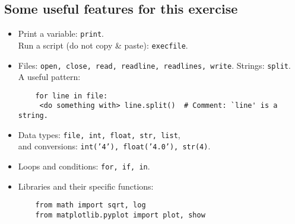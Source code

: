 \documentclass[a4paper,11pt]{article}
\begin{document}
\subsection{Some useful features for this exercise}
\begin{itemize}
\item Print a variable: \texttt{print}. \\
    Run a script (do not copy \& paste): \texttt{execfile}.
\item Files: \texttt{open, close, read, readline, readlines, write}. Strings: \texttt{split}. \\
      A useful pattern:
	\begin{verbatim}
	for line in file:
     <do something with> line.split()  # Comment: `line' is a string.
	\end{verbatim}
\item Data types: \texttt{file, int, float, str, list}, \\
	  	and conversions: \texttt{int('4'), float('4.0'), str(4)}.
\item Loops and conditions: \texttt{for, if, in}.
\item Libraries and their specific functions: 
	\begin{verbatim}
	from math import sqrt, log
	from matplotlib.pyplot import plot, show
	\end{verbatim}
\end{itemize}
\end{document}
